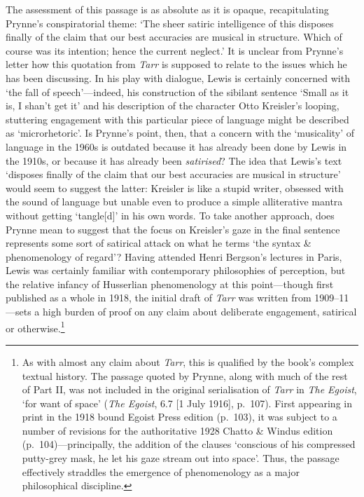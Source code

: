 \documentclass[]{article}
\begin{document}
\noindent The assessment of this passage is as absolute as it is opaque,
recapitulating Prynne’s conspiratorial theme: ‘The sheer satiric
intelligence of this disposes finally of the claim that our best
accuracies are musical in structure. Which of course was its intention;
hence the current neglect.’ It is unclear from Prynne’s letter how this
quotation from \emph{Tarr} is supposed to relate to the issues which he
has been discussing. In his play with dialogue, Lewis is certainly
concerned with ‘the fall of speech’—indeed, his construction of the
sibilant sentence ‘Small as it is, I shan’t get it’ and his description
of the character Otto Kreisler’s looping, stuttering engagement with
this particular piece of language might be described as ‘microrhetoric’.
Is Prynne’s point, then, that a concern with the ‘musicality’ of
language in the 1960s is outdated because it has already been done by
Lewis in the 1910s, or because it has already been \emph{satirised}? The
idea that Lewis’s text ‘disposes finally of the claim that our best
accuracies are musical in structure’ would seem to suggest the latter:
Kreisler is like a stupid writer, obsessed with the sound of language
but unable even to produce a simple alliterative mantra without getting
‘tangle{[}d{]}’ in his own words. To take another approach, does Prynne
mean to suggest that the focus on Kreisler’s gaze in the final sentence
represents some sort of satirical attack on what he terms ‘the syntax \&
phenomenology of regard’? Having attended Henri Bergson’s lectures in
Paris, Lewis was certainly familiar with contemporary philosophies of
perception, but the relative infancy of Husserlian phenomenology at this
point—though first published as a whole in 1918, the initial draft of
\emph{Tarr} was written from 1909–11—sets a high burden of proof on any
claim about deliberate engagement, satirical or otherwise.\footnote{As
  with almost any claim about \emph{Tarr}, this is qualified by the
  book’s complex textual history. The passage quoted by Prynne, along
  with much of the rest of Part II, was not included in the original
  serialisation of \emph{Tarr} in \emph{The Egoist}, ‘for want of space’
  (\emph{The Egoist}, 6.7 {[}1 July 1916{]}, p.~107). First appearing in
  print in the 1918 bound Egoist Press edition (p.~103), it was subject
  to a number of revisions for the authoritative 1928 Chatto \& Windus
  edition (p.~104)—principally, the addition of the clauses ‘conscious
  of his compressed putty-grey mask, he let his gaze stream out into
  space’. Thus, the passage effectively straddles the emergence of
  phenomenology as a major philosophical discipline.}
\end{document}
